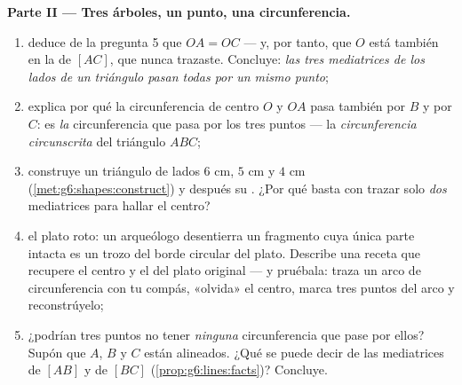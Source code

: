 \begin{problem}
\medskip
\noindent\textbf{Parte II --- Tres árboles, un punto, una
circunferencia.}
\begin{enumerate}[resume]
  \item deduce de la pregunta 5 que $OA = OC$ --- y, por tanto,
        que $O$ está también en la  de
        $[AC]$, que nunca trazaste. Concluye: \emph{las tres
        mediatrices de los lados de un triángulo pasan todas
        por un mismo punto};
  \item explica por qué la circunferencia de centro $O$ y  $OA$
        pasa también por $B$ y por $C$: es
        \emph{la} circunferencia que pasa por los tres puntos --- la
        \emph{circunferencia circunscrita}
        del triángulo $ABC$;
  \item construye un triángulo de lados $6$ cm, $5$ cm y
        $4$ cm (\cref{met:g6:shapes:construct}) y después su
        . ¿Por qué basta con trazar solo
        \emph{dos} mediatrices para hallar el centro?
  \item el plato roto: un arqueólogo desentierra un fragmento cuya
        única parte intacta es un trozo del borde circular del plato.
        Describe una receta que recupere el centro y el
         del plato original --- y pruébala: traza un
        arco de circunferencia con tu compás, «olvida» el centro,
        marca tres puntos del arco y reconstrúyelo;
  \item ¿podrían tres puntos no tener \emph{ninguna} circunferencia que pase por
        ellos? Supón que $A$, $B$ y $C$ están alineados. ¿Qué se puede
        decir de las mediatrices de $[AB]$ y de
        $[BC]$ (\cref{prop:g6:lines:facts})? Concluye.
\end{enumerate}


\end{problem}
